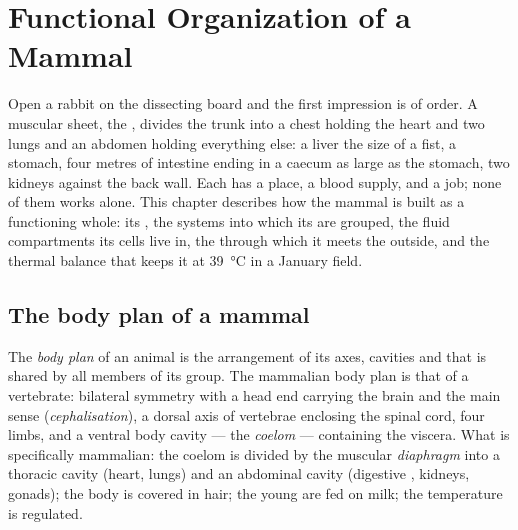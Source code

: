 \chapter{Functional Organization of a Mammal}\label{ch:b1:mammal-organization}

Open a rabbit on the dissecting board and the first impression is of
order. A muscular sheet, the , divides the trunk into a chest
holding the heart and two lungs and an abdomen holding everything
else: a liver the size of a fist, a stomach, four metres of intestine
ending in a caecum as large as the stomach, two kidneys against the
back wall. Each  has a place, a blood supply, and a job; none of
them works alone. This chapter describes how the mammal is built as a
functioning whole: its , the systems into which its  are
grouped, the fluid compartments its cells live in, the 
through which it meets the outside, and the thermal balance that keeps
it at \qty{39}{\celsius} in a January field.

\section{The body plan of a mammal}

\begin{definition}\label{def:b1:mammal-organization:bodyplan}
The \emph{body plan} of an animal is the arrangement
of its axes, cavities and  that is shared by all members of its
group. The mammalian body plan is that of a vertebrate: bilateral
symmetry with a head end carrying the brain and the main sense 
(\emph{cephalisation}), a dorsal axis of vertebrae
enclosing the spinal cord, four limbs, and a ventral body cavity ---
the \emph{coelom} --- containing the viscera. What is
specifically mammalian: the coelom is divided by the muscular
\emph{diaphragm} into a thoracic cavity (heart, lungs)
and an abdominal cavity (digestive , kidneys, gonads); the body
is covered in hair; the young are fed on milk; the temperature is
regulated.
\end{definition}

